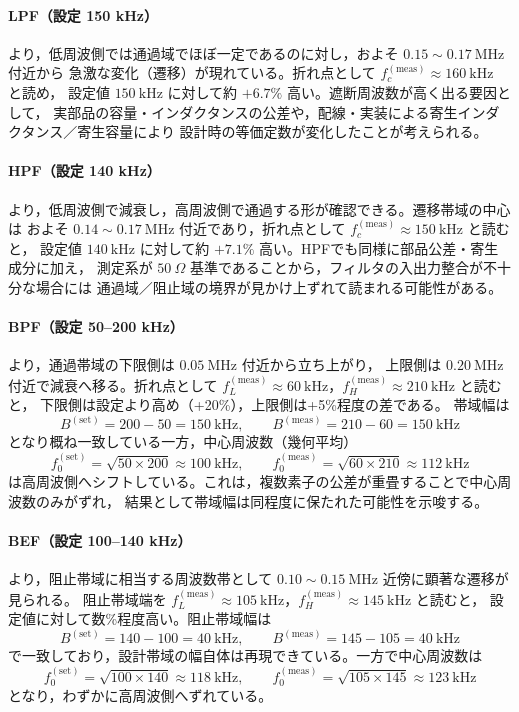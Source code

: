 \documentclass[11pt,dvipdfmx]{jarticle}
\begin{document}
\paragraph{LPF（設定 150 kHz）}
より，低周波側では通過域でほぼ一定であるのに対し，およそ $0.15\sim 0.17\ \mathrm{MHz}$ 付近から
急激な変化（遷移）が現れている。折れ点として $f_c^{(\mathrm{meas})}\approx 160\ \mathrm{kHz}$ と読め，
設定値 $150\ \mathrm{kHz}$ に対して約 $+6.7\%$ 高い。遮断周波数が高く出る要因として，
実部品の容量・インダクタンスの公差や，配線・実装による寄生インダクタンス／寄生容量により
設計時の等価定数が変化したことが考えられる。

\paragraph{HPF（設定 140 kHz）}
より，低周波側で減衰し，高周波側で通過する形が確認できる。遷移帯域の中心は
およそ $0.14\sim 0.17\ \mathrm{MHz}$ 付近であり，折れ点として $f_c^{(\mathrm{meas})}\approx 150\ \mathrm{kHz}$ と読むと，
設定値 $140\ \mathrm{kHz}$ に対して約 $+7.1\%$ 高い。HPFでも同様に部品公差・寄生成分に加え，
測定系が $50\ \Omega$ 基準であることから，フィルタの入出力整合が不十分な場合には
通過域／阻止域の境界が見かけ上ずれて読まれる可能性がある。

\paragraph{BPF（設定 50--200 kHz）}
より，通過帯域の下限側は $0.05\ \mathrm{MHz}$ 付近から立ち上がり，
上限側は $0.20\ \mathrm{MHz}$ 付近で減衰へ移る。折れ点として
$f_L^{(\mathrm{meas})}\approx 60\ \mathrm{kHz}$，$f_H^{(\mathrm{meas})}\approx 210\ \mathrm{kHz}$ と読むと，
下限側は設定より高め（+20\%），上限側は+5\%程度の差である。
帯域幅は
\[
B^{(\mathrm{set})}=200-50=150\ \mathrm{kHz},\qquad
B^{(\mathrm{meas})}=210-60=150\ \mathrm{kHz}
\]
となり概ね一致している一方，中心周波数（幾何平均）
\[
f_0^{(\mathrm{set})}=\sqrt{50\times 200}\approx 100\ \mathrm{kHz},\qquad
f_0^{(\mathrm{meas})}=\sqrt{60\times 210}\approx 112\ \mathrm{kHz}
\]
は高周波側へシフトしている。これは，複数素子の公差が重畳することで中心周波数のみがずれ，
結果として帯域幅は同程度に保たれた可能性を示唆する。

\paragraph{BEF（設定 100--140 kHz）}
より，阻止帯域に相当する周波数帯として $0.10\sim 0.15\ \mathrm{MHz}$ 近傍に顕著な遷移が見られる。
阻止帯域端を $f_L^{(\mathrm{meas})}\approx 105\ \mathrm{kHz}$，$f_H^{(\mathrm{meas})}\approx 145\ \mathrm{kHz}$ と読むと，
設定値に対して数\%程度高い。阻止帯域幅は
\[
B^{(\mathrm{set})}=140-100=40\ \mathrm{kHz},\qquad
B^{(\mathrm{meas})}=145-105=40\ \mathrm{kHz}
\]
で一致しており，設計帯域の幅自体は再現できている。一方で中心周波数は
\[
f_0^{(\mathrm{set})}=\sqrt{100\times 140}\approx 118\ \mathrm{kHz},\qquad
f_0^{(\mathrm{meas})}=\sqrt{105\times 145}\approx 123\ \mathrm{kHz}
\]
となり，わずかに高周波側へずれている。
\end{document}
